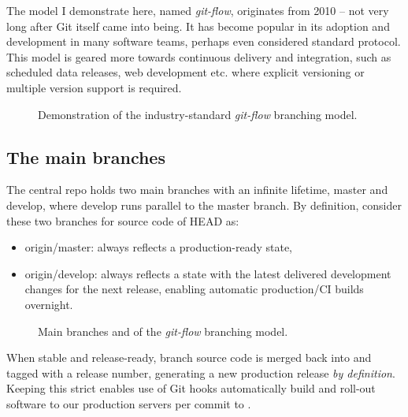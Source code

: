 The model I demonstrate here, named \emph{git-flow}, originates from 2010 -- not very long after Git itself came into being. It has become popular in its adoption and development in many software teams, perhaps even considered standard protocol. This model is geared more towards continuous delivery and integration, such as scheduled data releases, web development etc. where explicit versioning or multiple version support is required.

\vspace{11\baselineskip}%
\begin{figure}[H]
	\centering
	\noindent\resizebox{\textwidth}{!}{}
	\caption[A successful Git branching model]{Demonstration of the industry-standard \emph{git-flow} branching model.}
\end{figure}



\subsection{The main branches}

The central repo holds two main branches with an infinite lifetime, master and develop, where develop runs parallel to the master branch. By definition, consider these two branches for source code of HEAD as:

\begin{itemize}
	\item origin/master: always reflects a production-ready state,
	\item origin/develop: always reflects a state with the latest delivered development changes for the next release, enabling automatic production/CI builds overnight.
\end{itemize}

\vspace{6\baselineskip}%
\begin{figure}[H]
	\centering
	\noindent\resizebox{.66\textwidth}{!}{}
	\caption[Main branches]{Main branches  and  of the \emph{git-flow} branching model.}
\end{figure}

When stable and release-ready,  branch source code is merged back into  and tagged with a release number, generating a new production release \emph{by definition}. Keeping this strict enables use of Git hooks automatically build and roll-out software to our production servers per commit to .



